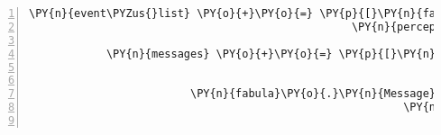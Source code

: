 \begin{Verbatim}[commandchars=\\\{\},numbers=left,firstnumber=1,stepnumber=1]
            \PY{n}{event\PYZus{}list} \PY{o}{+}\PY{o}{=} \PY{p}{[}\PY{n}{fabula}\PY{o}{.}\PY{n}{PerceptionEvent}\PY{p}{(}\PY{n}{identifier}\PY{o}{=}\PY{n}{ID\PYZus{}KUNI}\PY{p}{,}
                                                  \PY{n}{perception}\PY{o}{=}\PY{l+s}{\PYZsq{}}\PY{l+s}{Cassandra schüttelt den Kopf.}\PY{l+s}{\PYZsq{}}\PY{p}{)}\PY{p}{]}

            \PY{n}{messages} \PY{o}{+}\PY{o}{=} \PY{p}{[}\PY{n}{fabula}\PY{o}{.}\PY{n}{Message}\PY{p}{(}\PY{p}{[}\PY{n}{fabula}\PY{o}{.}\PY{n}{PerceptionEvent}\PY{p}{(}\PY{n}{identifier}\PY{o}{=}\PY{n}{ID\PYZus{}CASSANDRA}\PY{p}{,}
                                                                \PY{n}{perception}\PY{o}{=}\PY{l+s}{\PYZsq{}}\PY{l+s}{Kuni möchte dir die }\PY{l+s}{\PYZsq{}}
                                                                           \PY{l+s}{\PYZsq{}}\PY{l+s}{Laute überreichen.}\PY{l+s}{\PYZsq{}}\PY{p}{)}\PY{p}{]}\PY{p}{)}\PY{p}{,}
                         \PY{n}{fabula}\PY{o}{.}\PY{n}{Message}\PY{p}{(}\PY{p}{[}\PY{n}{fabula}\PY{o}{.}\PY{n}{SaysEvent}\PY{p}{(}\PY{n}{identifier}\PY{o}{=}\PY{n}{ID\PYZus{}CASSANDRA}\PY{p}{,}
                                                          \PY{n}{text}\PY{o}{=}\PY{l+s}{\PYZsq{}}\PY{l+s}{Ich kann leider keine Saiteninstrumente spielen.}\PY{l+s}{\PYZsq{}}\PY{p}{)}\PY{p}{]}\PY{p}{)}\PY{p}{]}


\end{Verbatim}
